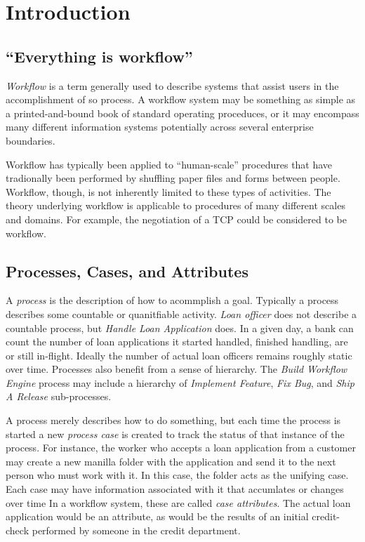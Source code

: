 
\chapter{Introduction}

\section{``Everything is workflow''}

\emph{Workflow} is a term generally used to describe systems that
assist users in the accomplishment of so process.  A workflow 
system may be something as simple as a printed-and-bound book
of standard operating proceduces, or it may encompass many
different information systems potentially across several
enterprise boundaries.

Workflow has typically been applied to ``human-scale'' procedures
that have tradionally been performed by shuffling paper files 
and forms between people.  Workflow, though, is not inherently
limited to these types of activities.  The theory underlying
workflow is applicable to procedures of many different scales
and domains.  For example, the negotiation of a TCP could be
considered to be workflow.

\section{Processes, Cases, and Attributes}

A \emph{process} is the description of how to acommplish a goal.
Typically a process describes some countable or quanitfiable
activity.  \emph{Loan officer} does not describe a countable
process, but \emph{Handle Loan Application} does.  In a given
day, a bank can count the number of loan applications it
started handled, finished handling, are or still in-flight.
Ideally the number of actual loan officers remains roughly
static over time.  Processes also benefit from a sense
of hierarchy.  The \emph{Build Workflow Engine} process may
include a hierarchy of \emph{Implement Feature}, \emph{Fix Bug},
and \emph{Ship A Release} sub-processes.

A process merely describes how to do something, but each
time the process is started a new \emph{process case} is
created to track the status of that instance of the 
process.  For instance, the worker who accepts a loan
application from a customer may create a new manilla
folder with the application and send it to the next
person who must work with it.  In this case, the folder
acts as the unifying case.  Each case may have information
associated with it that accumlates or changes over time
In a workflow system, these are called \emph{case attributes}.
The actual loan application would be an attribute, as
would be the results of an initial credit-check performed
by someone in the credit department.


